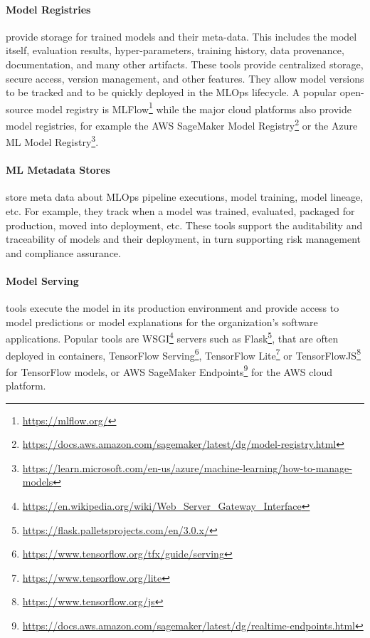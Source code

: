 \paragraph*{Model Registries} provide storage for trained models and their meta-data. This includes the model itself, evaluation results, hyper-parameters, training history, data provenance, documentation, and many other artifacts. These tools provide centralized storage, secure access, version management, and other features. They allow model versions to be tracked and to be quickly deployed in the MLOps lifecycle. A popular open-source model registry is MLFlow\footnote{\url{https://mlflow.org/}} while the major cloud platforms also provide model registries, for example the AWS SageMaker Model Registry\footnote{\url{https://docs.aws.amazon.com/sagemaker/latest/dg/model-registry.html}} or the Azure ML Model Registry\footnote{\url{https://learn.microsoft.com/en-us/azure/machine-learning/how-to-manage-models}}.

\paragraph*{ML Metadata Stores} store meta data about MLOps pipeline executions, model training, model lineage, etc. For example, they track when a model was trained, evaluated, packaged for production, moved into deployment, etc. These tools support the auditability and traceability of models and their deployment, in turn supporting risk management and compliance assurance.

\paragraph*{Model Serving} tools execute the model in its production environment and provide access to model predictions or model explanations for the organization's software applications. Popular tools are WSGI\footnote{\url{https://en.wikipedia.org/wiki/Web_Server_Gateway_Interface}} servers such as Flask\footnote{\url{https://flask.palletsprojects.com/en/3.0.x/}}, that are often deployed in containers, TensorFlow Serving\footnote{\url{https://www.tensorflow.org/tfx/guide/serving}}, TensorFlow Lite\footnote{\url{https://www.tensorflow.org/lite}} or TensorFlowJS\footnote{\url{https://www.tensorflow.org/js}} for TensorFlow models, or AWS SageMaker Endpoints\footnote{\url{https://docs.aws.amazon.com/sagemaker/latest/dg/realtime-endpoints.html}} for the AWS cloud platform. 

